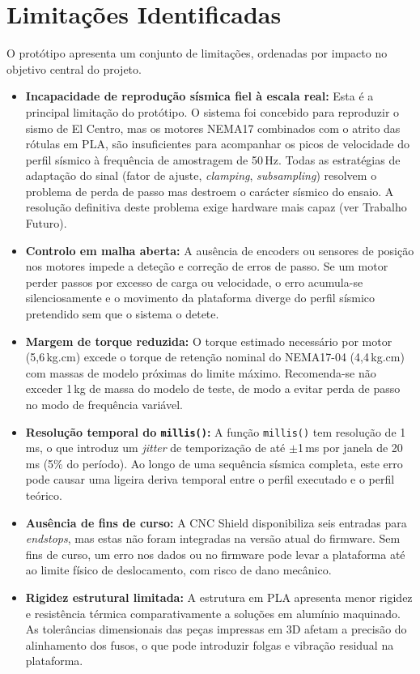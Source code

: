 \section{Limitações Identificadas}
\label{sec:limitacoes}

O protótipo apresenta um conjunto de limitações, ordenadas por impacto no objetivo central do projeto.

\begin{itemize}
    \item \textbf{Incapacidade de reprodução sísmica fiel à escala real:} Esta é a principal limitação do protótipo. O sistema foi concebido para reproduzir o sismo de El Centro, mas os motores NEMA17 combinados com o atrito das rótulas em PLA, são insuficientes para acompanhar os picos de velocidade do perfil sísmico à frequência de amostragem de 50\,Hz. Todas as estratégias de adaptação do sinal (fator de ajuste, \textit{clamping}, \textit{subsampling}) resolvem o problema de perda de passo mas destroem o carácter sísmico do ensaio. A resolução definitiva deste problema exige hardware mais capaz (ver Trabalho Futuro).

    \item \textbf{Controlo em malha aberta:} A ausência de encoders ou sensores de posição nos motores impede a deteção e correção de erros de passo. Se um motor perder passos por excesso de carga ou velocidade, o erro acumula-se silenciosamente e o movimento da plataforma diverge do perfil sísmico pretendido sem que o sistema o detete.

    \item \textbf{Margem de torque reduzida:} O torque estimado necessário por motor (5,6\,kg.cm) excede o torque de retenção nominal do NEMA17-04 (4,4\,kg.cm) com massas de modelo próximas do limite máximo. Recomenda-se não exceder 1\,kg de massa do modelo de teste, de modo a evitar perda de passo no modo de frequência variável.

    \item \textbf{Resolução temporal do \texttt{millis()}:} A função \texttt{millis()} tem resolução de 1\,ms, o que introduz um \textit{jitter} de temporização de até $\pm$1\,ms por janela de 20\,ms (5\% do período). Ao longo de uma sequência sísmica completa, este erro pode causar uma ligeira deriva temporal entre o perfil executado e o perfil teórico.

    \item \textbf{Ausência de fins de curso:} A CNC Shield disponibiliza seis entradas para \textit{endstops}, mas estas não foram integradas na versão atual do firmware. Sem fins de curso, um erro nos dados ou no firmware pode levar a plataforma até ao limite físico de deslocamento, com risco de dano mecânico.

    \item \textbf{Rigidez estrutural limitada:} A estrutura em PLA apresenta menor rigidez e resistência térmica comparativamente a soluções em alumínio maquinado. As tolerâncias dimensionais das peças impressas em 3D afetam a precisão do alinhamento dos fusos, o que pode introduzir folgas e vibração residual na plataforma.
\end{itemize}



